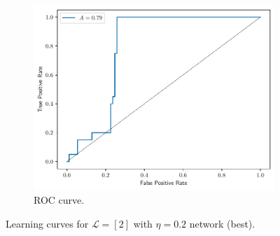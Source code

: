 \documentclass[conference]{IEEEtran}
\theoremstyle{definition}
\theoremstyle{remark}
\theoremstyle{remark}
\begin{document}
\begin{figure}
\begin{subfigure}[b]{0.32\textwidth}
        \includegraphics[width=\textwidth]{figs/2-0.2-emb-roc.pdf}
        \caption{ROC curve.}
    \end{subfigure}
    \caption{Learning curves for $\mathcal{L}=[2]$ with $\eta=0.2$ network
    (best).}
    \label{fig:NN-emb-best}
\end{figure}
\end{document}
